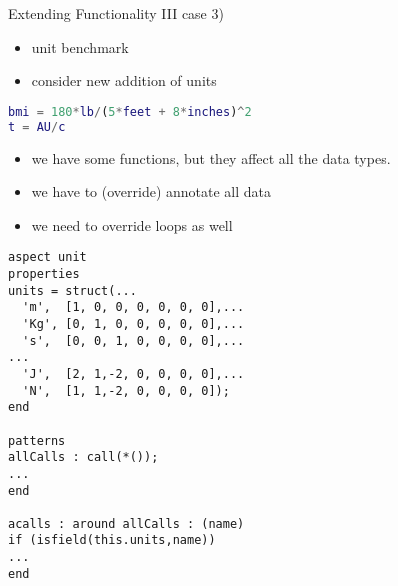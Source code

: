 \begin{frame}[fragile]{Extending Functionality III}
case 3)
\begin{itemize}
\item unit benchmark
\item consider new addition of units
\end{itemize}
\begin{lstlisting}[language=Matlab]
bmi = 180*lb/(5*feet + 8*inches)^2
t = AU/c
\end{lstlisting}
\begin{itemize}
 \item we have some functions, but they affect all the data types.
 \item we have to (override) annotate all data
 \item we need to override loops as well
\end{itemize}
\begin{lstlisting}
aspect unit
properties
units = struct(...
  'm',  [1, 0, 0, 0, 0, 0, 0],...
  'Kg', [0, 1, 0, 0, 0, 0, 0],...
  's',  [0, 0, 1, 0, 0, 0, 0],...
...
  'J',  [2, 1,-2, 0, 0, 0, 0],...
  'N',  [1, 1,-2, 0, 0, 0, 0]);
end

patterns
allCalls : call(*());
...
end

acalls : around allCalls : (name)
if (isfield(this.units,name))
...
end
\end{lstlisting}

\end{frame}

